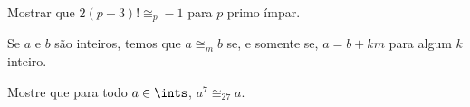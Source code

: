 \begin{exercise}
    Mostrar que $2(p-3)! \cong_p -1$ para $p$ primo ímpar.
\end{exercise}

\begin{exercise}
    Se $a$ e $b$ são inteiros, temos que $a \cong_m b$ se, e somente se, $a = b
    + km$ para algum $k$ inteiro.
\end{exercise}

\begin{homework}
    Mostre que para todo $a \in \ints$, $a^7 \cong_{27} a$.
\end{homework}
